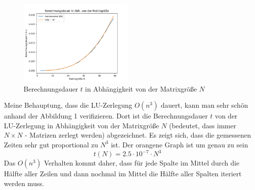 \documentclass{article}
\begin{document}
	\begin{figure}
		\centering
		\includegraphics[width=0.5\textwidth]{fig1}
		\caption{Berechnungsdauer $t$ in Abhängigkeit von der Matrixgröße $N$}
	\end{figure}
	Meine Behauptung, dass die LU-Zerlegung $O(n^3)$ dauert, kann man sehr schön anhand der Abbildung 1 verifizieren. Dort ist die Berechnungsdauer $t$ von der LU-Zerlegung in Abhängigkeit von der Matrixgröße $N$ (bedeutet, dass immer $N\times N$ - Matrizen zerlegt werden) abgezeichnet. Es zeigt sich, dass die gemessenen Zeiten sehr gut proportional zu $N^3$ ist. Der orangene Graph ist um genau zu sein
	$$t(N) = 2.5 \cdot 10^{-7} \cdot N^3$$
	Das $O(n^3)$ Verhalten kommt daher, dass für jede Spalte im Mittel durch die Hälfte aller Zeilen und dann nochmal im Mittel die Hälfte aller Spalten iteriert werden muss.
\end{document}
